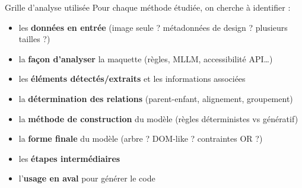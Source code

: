 \documentclass[10pt,aspectratio=169]{beamer}
\begin{document}
\begin{frame}{Grille d'analyse utilisée}
Pour chaque méthode étudiée, on cherche à identifier :
\begin{itemize}
  \item les \textbf{données en entrée} (image seule ? métadonnées de design ? plusieurs tailles ?)
  \item la \textbf{façon d'analyser} la maquette (règles, MLLM, accessibilité API\ldots)
  \item les \textbf{éléments détectés/extraits} et les informations associées
  \item la \textbf{détermination des relations} (parent-enfant, alignement, groupement)
  \item la \textbf{méthode de construction} du modèle (règles déterministes vs génératif)
  \item la \textbf{forme finale} du modèle (arbre ? DOM-like ? contraintes OR ?)
  \item les \textbf{étapes intermédiaires}
  \item l'\textbf{usage en aval} pour générer le code
\end{itemize}
\end{frame}

\end{document}
